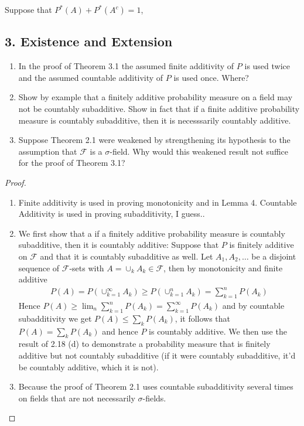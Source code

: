 \documentclass[11pt]{article}
\newcommand{\F}{\mathcal{F}}
\newcommand{\mc}{\mathcal}
\newenvironment{exercise}[2][Exercise]{\begin{trivlist}
\item[\hskip \labelsep {\bfseries #1}\hskip \labelsep {\bfseries #2.}]}{\end{trivlist}}
\begin{document}
Suppose that $P^{\ast} (A) + P^{\ast} (A^c) = 1$, 

\subsection*{3. Existence and Extension}
\begin{exercise}{3.1}
    \begin{enumerate}
        \item In the proof of Theorem 3.1 the assumed finite additivity of $P$ is used twice and the assumed countable additivity of $P$ is used once. Where?
        \item Show by example that a finitely additive probability measure on a field may not be countably subadditive. Show in fact that if a finite additive probability measure is countably subadditive, then it is necesssarily countably additive.
        \item Suppose Theorem 2.1 were weakened by strengthening its hypothesis to the assumption that $\mc F$ is a $\sigma$-field. Why would this weakened result not suffice for the proof of Theorem 3.1?
    \end{enumerate}
\end{exercise}
\begin{proof}
    \begin{enumerate}
        \item Finite additivity is used in proving monotonicity and in Lemma 4. Countable Additivity is used in proving subadditivity, I guess..
        \item We first show that a if a finitely additive probability measure is countably subadditive, then it is countably additive: Suppose that $P$ is finitely additive on $\F$ and that it is countably subadditive as well. Let $A_1, A_2, \ldots$ be a disjoint sequence of $\F$-sets with $A = \cup_k A_k \in \F$, then by monotonicity and finite additive
        \begin{align*}
            P(A) = P\left ( \cup_{k=1}^{\infty} A_k \right ) \geq P \left ( \cup_{k=1}^{n} A_k \right) = \sum_{k=1}^{n} P(A_k) 
        \end{align*}
        Hence $P(A) \geq \lim_n \sum_{k=1}^{n} P(A_k) = \sum_{k=1}^{\infty} P(A_k)$ and by countable subadditivity we get $P(A) \leq \sum_k P(A_k)$, it follows that $P(A) = \sum_k P(A_k)$ and hence $P$ is countably additive. We then use the result of 2.18 (d) to demonstrate a probability measure that is finitely additive but not countably subadditive (if it were countably subadditive, it'd be countably additive, which it is not).
        \item Because the proof of Theorem 2.1 uses countable subadditivity several times on fields that are not necessarily $\sigma$-fields.
    \end{enumerate}
\end{proof}
\end{document}
